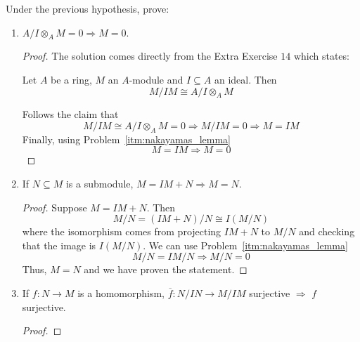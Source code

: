 \begin{problem}
    Under the previous hypothesis, prove:
    \begin{enumerate}[label=(\theproblem.\arabic*),ref=\theproblem.\arabic*]
        \item \label{itm:2_1} $A/I \otimes_A M = 0 \Rightarrow M = 0$.
            \begin{sol}
                \begin{proof}
                    The solution comes directly from the Extra Exercise $14$ which states:
                    \begin{claim}
                        Let $A$ be a ring, $M$ an $A$-module and $I \subseteq A$ an ideal.
                        Then
                        \[
                            M/IM \cong A/I \otimes_A M
                        \]
                    \end{claim}
                    Follows the claim that
                    \[
                        M/IM \cong A/I \otimes_A M = 0 \Rightarrow M/IM = 0 \Rightarrow M = IM
                    \]
                    Finally, using Problem~\ref{itm:nakayamas_lemma}
                    \[
                        M = IM \Rightarrow M = 0
                    \]
                \end{proof}
            \end{sol}
        \item \label{itm:2_2} If $N \subseteq M$ is a submodule, $M = IM + N \Rightarrow M = N$.
            \begin{sol}
                \begin{proof}
                    Suppose $M = IM + N$.
                    Then
                    \[
                        M / N = (IM + N) / N \cong I (M / N)
                    \]
                    where the isomorphism comes from projecting $IM+N$ to $M/N$
                    and checking that the image is $I (M/N)$.
                    We can use Problem~\ref{itm:nakayamas_lemma}
                    \[
                        M/N = IM/N \Rightarrow M/N = 0
                    \]
                    Thus, $M = N$ and we have proven the statement.
                \end{proof}
            \end{sol}
        \item If $f: N \rightarrow M$ is a homomorphism, $\overline{f}: N/IN \rightarrow M/IM$ surjective $\Rightarrow$ $f$ surjective.
            \begin{sol}
                \begin{proof}

\end{proof}
\end{sol}
\end{enumerate}
\end{problem}
